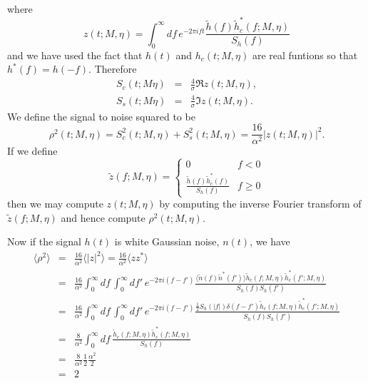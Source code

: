 where
\begin{equation}
z(t;M,\eta) = \int_0^\infty df\, e^{-2\pi ift} 
    \frac{\tilde{h}(f)\tilde{h}_c^\ast(f;M,\eta)}{S_h(f)}
\end{equation}
and we have used the fact that ${h}(t)$ and ${h}_c(t;M,\eta)$
are real funtions so that $h^\ast(f) = h(-f)$. Therefore
\begin{eqnarray}
S_c(t;M\eta) &=& \frac{4}{\sigma} \Re z(t;M,\eta), \\
S_s(t;M\eta) &=& \frac{4}{\sigma} \Im z(t;M,\eta).
\end{eqnarray}
We define the signal to noise squared to be
\begin{equation}
\rho^2(t;M,\eta) = S_c^2(t;M,\eta) + S_s^2(t;M,\eta)
= \frac{16}{\alpha^2} |z(t;M,\eta)|^2.
\end{equation}
If we define 
\begin{equation}
  \tilde{z}(f;M,\eta) = \left\{
    \begin{array}{ll}
      0 & f < 0 \\
      \frac{\tilde{h}(f) \tilde{h}^\ast_c(f)}{S_h(f)} & f \ge 0
    \end{array}
  \right.
\end{equation}
then we may compute $z(t;M,\eta)$ by computing the inverse Fourier 
transform of $\tilde{z}(f;M,\eta)$ and hence compute $\rho^2(t;M,\eta)$.

Now if the signal $h(t)$ is white Gaussian noise, $n(t)$, we have
\begin{eqnarray}
\nonumber
\langle \rho^2 \rangle 
&=& \frac{16}{\alpha^2} \langle |z|^2 \rangle 
    = \frac{16}{\alpha^2} \langle zz^\ast \rangle\\
\nonumber
&=& \frac{16}{\alpha^2} \int_0^\infty df\, \int_0^\infty df'\,
    e^{-2\pi i(f-f')}
      \frac{ \langle \tilde{n}(f) \tilde{n}^\ast(f') \rangle
             \tilde{h}_c(f;M,\eta) \tilde{h}^\ast_c(f';M,\eta)}
      {S_h(f) S_h(f')} \\
\nonumber
&=& \frac{16}{\alpha^2} \int_0^\infty df\, \int_0^\infty df'\,
    e^{-2\pi i(f-f')} 
      \frac{ \frac{1}{2} S_h(|f|) \delta(f-f')
             \tilde{h}_c(f;M,\eta) \tilde{h}^\ast_c(f';M,\eta)}
      {S_h(f) S_h(f')} \\
\nonumber
&=& \frac{8}{\alpha^2}\int_0^\infty df\,
      \frac{ \tilde{h}_c(f;M,\eta) \tilde{h}^\ast_c(f;M,\eta)}
      {S_h(f)} \\
\nonumber
&=& \frac{8}{\alpha^2} \frac{1}{2} \frac{\alpha^2}{2} \\
&=& 2 
\end{eqnarray}

